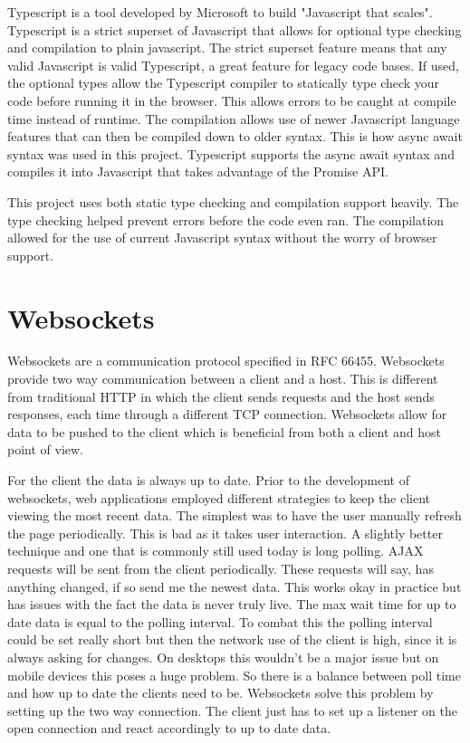 Typescript is a tool developed by Microsoft to build "Javascript that scales".\cite{typescript}
Typescript is a strict superset of Javascript that allows for optional type checking and compilation to plain javascript. The strict superset feature means that any valid Javascript is valid Typescript, a great feature for legacy code bases. If used, the optional types allow the Typescript compiler to statically type check your code before running it in the browser. This allows errors to be caught at compile time instead of runtime. The compilation allows use of newer Javascript language features that can then be compiled down to older syntax. This is how async await syntax was used in this project. Typescript supports the async await syntax and compiles it into Javascript that takes advantage of the Promise API. 


This project uses both static type checking and compilation support heavily. The type checking helped prevent errors before the code even ran. The compilation allowed for the use of current Javascript syntax without the worry of browser support. 


\section{Websockets}


Websockets are a communication protocol specified in RFC 66455.\cite{websocket-rfc} Websockets provide two way communication between a client and a host. This is different from traditional HTTP in which the client sends requests and the host sends responses, each time through a different TCP connection. Websockets allow for data to be pushed to the client which is beneficial from both a client and host point of view.


For the client the data is always up to date. Prior to the development of websockets, web applications employed different strategies to keep the client viewing the most recent data. The simplest was to have the user manually refresh the page periodically. This is bad as it takes user interaction. A slightly better technique and one that is commonly still used today is long polling. AJAX requests will be sent from the client periodically. These requests will say, has anything changed, if so send me the newest data. This works okay in practice but has issues with the fact the data is never truly live. The max wait time for up to date data is equal to the polling interval. To combat this the polling interval could be set really short but then the network use of the client is high, since it is always asking for changes. On desktops this wouldn’t be a major issue but on mobile devices this poses a huge problem. So there is a balance between poll time and how up to date the clients need to be. Websockets solve this problem by setting up the two way connection. The client just has to set up a listener on the open connection and react accordingly to up to date data.


